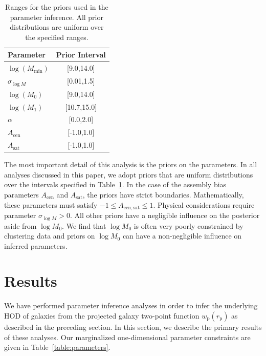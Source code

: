 \documentclass[usenatbib,usegraphicx,letterpaper]{mn2e}
\newcommand{\wprp}{w_{\mathrm{p}}}
\newcommand{\rp}{r_{\mathrm{p}}}
\begin{document}
\begin{table}
\begin{center}
{\renewcommand{\arraystretch}{1.3}
\renewcommand{\tabcolsep}{0.2cm}
\begin{tabular}{l c}
\hline
\hline
Parameter & Prior Interval\\
\hline
$\log (M_{\mathrm{min}})$ & [9.0,14.0] \\
$\sigma_{\log M}$ & [0.01,1.5] \\
$\log (M_0)$ & [9.0,14.0]\\
$\log (M_1)$ & [10.7,15.0]\\
$\alpha$ & [0.0,2.0]\\
$A_{\mathrm{cen}}$ & [-1.0,1.0]\\
$A_{\mathrm{sat}}$ & [-1.0,1.0]\\
\hline
\end{tabular}
\medskip
\caption{
Ranges for the priors used in the parameter inference. All prior distributions are uniform over the
specified ranges.}
 }
 \label{table:priors}
 \end{center}
\end{table}


The most important detail of this analysis is the priors on the parameters. In all analyses
discussed in this paper, we adopt priors that are uniform distributions over the intervals
specified in Table~\ref{table:priors}. In the case of the assembly bias parameters
$A_{\mathrm{cen}}$ and $A_{\mathrm{sat}}$, the priors have strict
boundaries. Mathematically, these parameters must satisfy $-1 \le A_{\mathrm{cen,sat}} \le 1$.
Physical considerations require parameter $\sigma_{\log M} > 0$. All other
priors have a negligible influence on the posterior aside from $\log M_0$.
We find that $\log M_0$ is often very poorly constrained by clustering data and
priors on $\log M_0$ can have a non-negligible influence on inferred parameters.


\section{Results}
\label{section:results}

We have performed parameter inference analyses in order to infer the underlying HOD of
galaxies from the projected galaxy two-point function $\wprp(\rp)$ as described in the preceding
section. In this section, we describe the primary results of these analyses. Our marginalized
one-dimensional parameter constraints are given in Table~\ref{table:parameters}.
\end{document}
